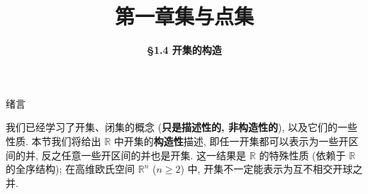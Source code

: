 \everymath{\displaystyle}



\title[第一章\\
集与点集]{\texorpdfstring{\LARGE \bfseries 第一章\quad 集与点集}{第一章 集与点集}} %
\author[\S 1.4\\
开集的构造] %
{\Large \bfseries \S 1.4 开集的构造}
\date{}





\begin{frame}

\titlepage %

\end{frame}





\begin{frame}{绪言}

{
\larger[1]\renewcommand{\baselinestretch}{1.5}\selectfont
我们已经学习了开集、闭集的概念 (\textbf{只是描述性的, 非构造性的}), 以及它们的一些性质. 本节我们将给出 $\mathbb{R}$ 中开集的\textbf{构造性}描述, 即任一开集都可以表示为一些开区间的并, 反之任意一些开区间的并也是开集. 这一结果是 $\mathbb{R}$ 的特殊性质 (依赖于 $\mathbb{R}$ 的全序结构); 在高维欧氏空间 $\mathbb{R}^n$ ($n \geqslant 2$) 中, 开集不一定能表示为互不相交开球之并.\par
}

\end{frame}

